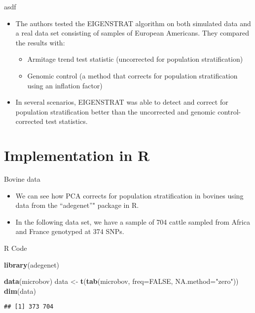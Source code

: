 \documentclass[ignorenonframetext,]{beamer}
\newenvironment{Shaded}{\begin{snugshade}}{\end{snugshade}}
\newcommand{\DataTypeTok}[1]{\textcolor[rgb]{0.13,0.29,0.53}{#1}}
\newcommand{\KeywordTok}[1]{\textcolor[rgb]{0.13,0.29,0.53}{\textbf{#1}}}
\newcommand{\NormalTok}[1]{#1}
\newcommand{\OtherTok}[1]{\textcolor[rgb]{0.56,0.35,0.01}{#1}}
\newcommand{\StringTok}[1]{\textcolor[rgb]{0.31,0.60,0.02}{#1}}
\providecommand{\tightlist}{%
  \setlength{\itemsep}{0pt}\setlength{\parskip}{0pt}}
\begin{document}
\begin{frame}{asdf}
\protect\hypertarget{asdf}{}

\begin{itemize}
\tightlist
\item
  The authors tested the EIGENSTRAT algorithm on both simulated data and
  a real data set consisting of samples of European Americans. They
  compared the results with:

  \begin{itemize}
  \tightlist
  \item
    Armitage trend test statistic (uncorrected for population
    stratification)
  \item
    Genomic control (a method that corrects for population
    stratification using an inflation factor)
  \end{itemize}
\item
  In several scenarios, EIGENSTRAT was able to detect and correct for
  population stratification better than the uncorrected and genomic
  control-corrected test statistics.
\end{itemize}

\end{frame}

\hypertarget{implementation-in-r}{%
\section{Implementation in R}\label{implementation-in-r}}

\begin{frame}[fragile]{Bovine data}
\protect\hypertarget{bovine-data}{}

\begin{itemize}
\tightlist
\item
  We can see how PCA corrects for population stratification in bovines
  using data from the ``adegenet''" package in R.
\item
  In the following data set, we have a sample of 704 cattle sampled from
  Africa and France genotyped at 374 SNPs.
\end{itemize}

\begin{block}{R Code}

\begin{Shaded}
\begin{Highlighting}[]
\KeywordTok{library}\NormalTok{(adegenet)}

\KeywordTok{data}\NormalTok{(microbov)}
\NormalTok{data <-}\StringTok{ }\KeywordTok{t}\NormalTok{(}\KeywordTok{tab}\NormalTok{(microbov, }\DataTypeTok{freq=}\OtherTok{FALSE}\NormalTok{, }\DataTypeTok{NA.method=}\StringTok{"zero"}\NormalTok{))}
\KeywordTok{dim}\NormalTok{(data)}
\end{Highlighting}
\end{Shaded}

\begin{verbatim}
## [1] 373 704
\end{verbatim}

\end{block}

\end{frame}
\end{document}
